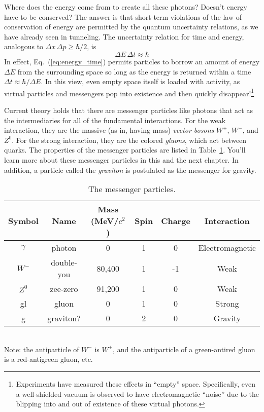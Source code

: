Where does the energy come from to create all these photons?
Doesn't energy have to be conserved?  The answer is that
short-term violations of the law of conservation of energy are
permitted by the quantum uncertainty relations, as we have already
seen in tunneling.  The uncertainty relation for time and energy,
analogous to $\Delta x\, \Delta p \geq \hbar/2$, is
\begin{equation}
\Delta E\, \Delta t \approx \hbar \label{eq:energy_time}
\end{equation}
In effect, Eq.~(\ref{eq:energy_time}) permits particles to borrow
an amount of energy $\Delta E$ from the surrounding space so long
as the energy is returned within a time $\Delta t \approx
\hbar/\Delta E$. In this view, even empty space itself is loaded
with activity, as virtual particles and messengers pop into
existence and then quickly disappear!\footnote{Experiments have
measured these effects in ``empty'' space. Specifically, even a
well-shielded vacuum is observed to have electromagnetic ``noise''
due to the blipping into and out of existence of these virtual
photons.}

Current theory holds that there are messenger particles like
photons that act as the intermediaries for all of the fundamental
interactions.  For the weak interaction, they are the massive (as
in, having mass) {\em vector bosons} $W^+$, $W^-$, and $Z^0$.  For
the strong interaction, they are the colored {\em gluons}, which
act between quarks.  The properties of the messenger particles are listed 
in Table~\ref{table:messengers}.  You'll learn more about these messenger
particles in this and the next chapter. In addition, a particle
called the {\em graviton} is postulated as the messenger for
gravity.

\begin{table}[tbp]
\caption{The messenger particles. \label{table:messengers}}
\begin{tabular}[t]{cccccc}
  Symbol & Name & Mass (MeV/$c^2$) & Spin & Charge & Interaction \\
  \hline\hline
  $\gamma$ & photon & 0 & 1 & 0 & Electromagnetic \\
  $W^-$ & double-you & 80,400 & 1 & -1 & Weak \\
  $Z^0$ & zee-zero & 91,200 & 1 & 0 & Weak \\
  gl & gluon & 0 & 1 & 0 & Strong \\
  g & graviton? & 0 & 2 & 0 & Gravity \\
  \hline
\end{tabular}\\[0.5ex]
Note: the antiparticle of $W^-$ is $W^+$, and the antiparticle of
a green-antired gluon is a red-antigreen gluon, etc.
\end{table}

